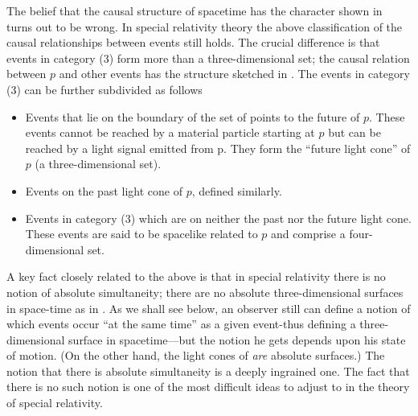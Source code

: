The belief that the causal structure of spacetime has the character shown in  turns out to be wrong. In special relativity theory the above classification of the causal relationships between events still holds. The crucial difference is that events in category (3) form more than a three-dimensional set; the causal relation between $p$ and other events has the structure sketched in . The events in category (3) can be further subdivided as follows
\begin{itemize}
    \item Events that lie on the boundary of the set of points to the future of $p$. These events cannot be reached by a material particle starting at $p$ but can be reached by a light signal emitted from p. They form the “future light cone'' of $p$ (a three-dimensional set).
    \item Events on the past light cone of $p$, defined similarly.
    \item Events in category (3) which are on neither the past nor the future light cone. These events are said to be spacelike related to $p$ and comprise a four-dimensional set.
\end{itemize}
    
A key fact closely related to the above is that in special relativity there is no notion of absolute simultaneity; there are no absolute three-dimensional surfaces in space-time as in . As we shall see below, an observer still can define a notion of which events occur ``at the same time'' as a given event-thus defining a three-dimensional surface in spacetime—but the notion he gets depends upon his state of motion. (On the other hand, the light cones of  \emph{are} absolute surfaces.) The notion that there is absolute simultaneity is a deeply ingrained one. The fact that there is no such notion is one of the most difficult ideas to adjust to in the theory of special relativity.

